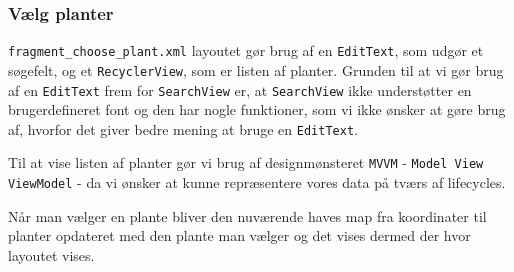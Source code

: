 \subsubsection{Vælg planter}

\texttt{fragment\_choose\_plant.xml} layoutet gør brug af en \texttt{EditText}, som udgør et søgefelt, og et \texttt{RecyclerView}, som er listen af planter.
Grunden til at vi gør brug af en \texttt{EditText} frem for \texttt{SearchView} er, at \texttt{SearchView} ikke understøtter en brugerdefineret font og den har nogle funktioner, som vi ikke ønsker at gøre brug af, hvorfor det giver bedre mening at bruge en \texttt{EditText}.

Til at vise listen af planter gør vi brug af designmønsteret \texttt{MVVM} - \texttt{Model View ViewModel} - da vi ønsker at kunne repræsentere vores data på tværs af lifecycles.

Når man vælger en plante bliver den nuværende haves map fra koordinater til planter opdateret med den plante man vælger og det vises dermed der hvor layoutet vises.
